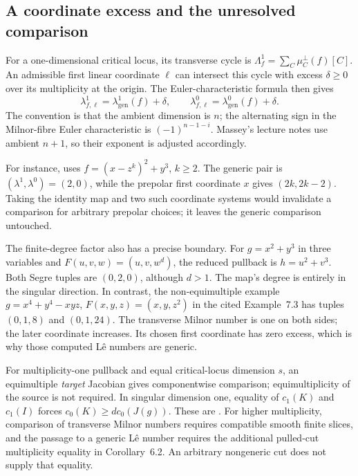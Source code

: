 \subsection{A coordinate excess and the unresolved comparison}
\label{sec:appH-Segre-generic-frontier}

For a one-dimensional critical locus, its transverse cycle is
$\Lambda^1_f=\sum_C\mu^\perp_C(f)[C]$. An admissible first
linear coordinate $\ell$ can intersect this cycle with excess
$\delta\geq0$ over its multiplicity at the origin. The
Euler-characteristic formula then gives
\[
 \lambda^1_{f,\ell}=\lambda^1_{\mathrm{gen}}(f)+\delta,
 \qquad
 \lambda^0_{f,\ell}=\lambda^0_{\mathrm{gen}}(f)+\delta.
\tag{H.85}\label{eq:appH-Segre-prepolar-excess}
\]
The convention is that the ambient dimension is $n$;
the alternating sign in the Milnor-fibre Euler characteristic
is $(-1)^{n-1-i}$. Massey's lecture notes use ambient $n+1$,
so their exponent is adjusted accordingly.

For instance, \cite[Example~7.4]{JelonekPerezSantos26SegreV1}
uses $f=(x-z^k)^2+y^3$, $k\geq2$. The generic pair is
$(\lambda^1,\lambda^0)=(2,0)$, while the prepolar first
coordinate $x$ gives $(2k,2k-2)$. Taking the identity map
and two such coordinate systems would invalidate a comparison
for arbitrary prepolar choices; it leaves the generic
comparison untouched.

The finite-degree factor also has a precise boundary. For
$g=x^2+y^3$ in three variables and
$F(u,v,w)=(u,v,w^d)$, the reduced pullback is $h=u^2+v^3$.
Both Segre tuples are $(0,2,0)$, although $d>1$.
The map's degree is entirely in the singular direction.
In contrast, the non-equimultiple example
$g=x^4+y^4-xyz$, $F(x,y,z)=(x,y,z^2)$ in the cited
Example~7.3 has tuples $(0,1,8)$ and $(0,1,24)$.
The transverse Milnor number is one on both sides;
the later coordinate increases. Its chosen first coordinate
has zero excess, which is why those computed L\^e numbers
are generic.

For multiplicity-one pullback and equal critical-locus
dimension $s$, an equimultiple \emph{target} Jacobian gives
componentwise comparison; equimultiplicity of the source is
not required. In singular dimension one, equality of
$c_1(K)$ and $c_1(I)$ forces
$c_0(K)\geq d c_0(J(g))$. These are
\cite[Theorems~5.3 and~5.5]{JelonekPerezSantos26SegreV1}.
For higher multiplicity, comparison of transverse Milnor
numbers requires compatible smooth finite slices, and the
passage to a generic L\^e number requires the additional
pulled-cut multiplicity equality in Corollary~6.2.
An arbitrary nongeneric cut does not supply that equality.

